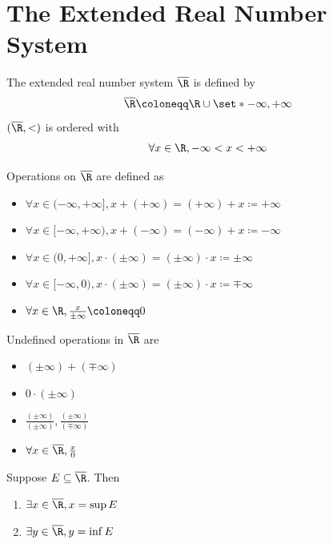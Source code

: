 \section{The Extended Real Number System}

\begin{definition} \label{an:def:extended-real-number-system}
  The extended real number system $\overline{\R}$ is defined by
  \[
    \overline{\R} \coloneqq \R \cup \set*{- \infty, + \infty}
  \]
  $(\overline{\R}, <)$ is ordered with
  \[
    \forall x \in \R, - \infty < x < + \infty
  \]
\end{definition}

\bigskip

\begin{definition} \label{an:def:operations-on-extended-real-number-system}
  Operations on $\overline{\R}$ are defined as
  \begin{itemize}
    \item $\forall x \in (- \infty, + \infty], x + (+ \infty) = (+ \infty) + x \coloneqq + \infty$
    \item $\forall x \in [- \infty, + \infty), x + (- \infty) = (- \infty) + x \coloneqq - \infty$
    \item $\forall x \in (0, + \infty], x \cdot (\pm \infty) = (\pm \infty) \cdot x \coloneqq \pm \infty$
    \item $\forall x \in [- \infty, 0), x \cdot (\pm \infty) = (\pm \infty) \cdot x \coloneqq \mp \infty$
    \item $\forall x \in \R, \frac{x}{\pm \infty} \coloneqq 0$
  \end{itemize}
  Undefined operations in $\overline{\R}$ are
  \begin{itemize}
    \item $(\pm \infty) + (\mp \infty)$
    \item $0 \cdot (\pm \infty)$
    \item $\frac{(\pm \infty)}{(\pm \infty)}, \frac{(\pm \infty)}{(\mp \infty)}$
    \item $\forall x \in \overline{\R}, \frac{x}{0}$
  \end{itemize}
\end{definition}

\bigskip

\begin{theorem} \label{an:thm:supremum-infimum-in-extended-real-number-system}
  Suppose $E \subseteq \overline{\R}$. Then
  \begin{enumerate}[label=\textbf{(\Alph*)}]
    \item $\exists x \in \overline{\R}, x = \sup E$
    \item $\exists y \in \overline{\R}, y = \inf E$
  \end{enumerate}
\end{theorem}

